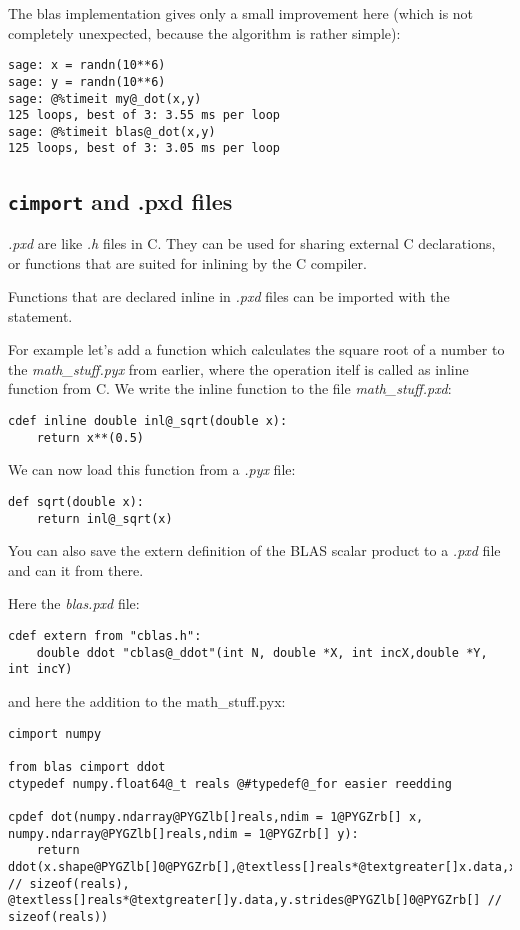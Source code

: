 \documentclass[letterpaper,10pt,english]{manual}
\begin{document}
The blas implementation gives only a small improvement here (which is
not completely unexpected, because the algorithm is rather simple):

\begin{Verbatim}[commandchars=@\[\]]
sage: x = randn(10**6)
sage: y = randn(10**6)
sage: @%timeit my@_dot(x,y)
125 loops, best of 3: 3.55 ms per loop
sage: @%timeit blas@_dot(x,y)
125 loops, best of 3: 3.05 ms per loop
\end{Verbatim}


\subsection{\texttt{cimport} and .pxd files}

\emph{.pxd} are like \emph{.h} files in C. They can be used for sharing external
C declarations, or functions that are suited for inlining by the C compiler.

Functions that are declared inline in \emph{.pxd} files can be imported with the
 statement.

For example let's add a function which calculates the square root of
a number to the \emph{math\_stuff.pyx} from earlier, where the operation
itelf is called as inline function from C. We write the inline
function to the file \emph{math\_stuff.pxd}:

\begin{Verbatim}[commandchars=@\[\]]
cdef inline double inl@_sqrt(double x):
    return x**(0.5)
\end{Verbatim}

We can now load this function from a \emph{.pyx} file:

\begin{Verbatim}[commandchars=@\[\]]
def sqrt(double x):
    return inl@_sqrt(x)
\end{Verbatim}

You can also save the extern definition of the BLAS scalar product to
a \emph{.pxd} file and can  it from there.

Here the \emph{blas.pxd} file:

\begin{Verbatim}[commandchars=@\[\]]
cdef extern from "cblas.h":
    double ddot "cblas@_ddot"(int N, double *X, int incX,double *Y, int incY)
\end{Verbatim}

and here the addition to the math\_stuff.pyx:

\begin{Verbatim}[commandchars=@\[\]]
cimport numpy

from blas cimport ddot
ctypedef numpy.float64@_t reals @#typedef@_for easier reedding

cpdef dot(numpy.ndarray@PYGZlb[]reals,ndim = 1@PYGZrb[] x, numpy.ndarray@PYGZlb[]reals,ndim = 1@PYGZrb[] y):
    return ddot(x.shape@PYGZlb[]0@PYGZrb[],@textless[]reals*@textgreater[]x.data,x.strides@PYGZlb[]0@PYGZrb[] // sizeof(reals), @textless[]reals*@textgreater[]y.data,y.strides@PYGZlb[]0@PYGZrb[] // sizeof(reals))
\end{Verbatim}
\end{document}
